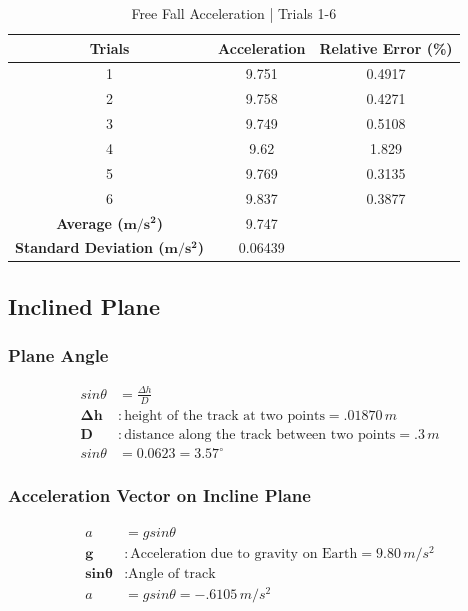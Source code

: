 \documentclass[a4paper,12pt]{article}
\begin{document}
\begin{table}[H]
\centering
\begin{tabular}{@{}ccc@{}}
\toprule
\textbf{Trials} & \textbf{Acceleration} & \textbf{Relative Error (\%)} \\ \midrule
1 & 9.751 & 0.4917 \\
2 & 9.758 & 0.4271 \\
3 & 9.749 & 0.5108 \\
4 & 9.62 & 1.829 \\
5 & 9.769 & 0.3135 \\
6 & 9.837 & 0.3877 \\ \midrule
\textbf{Average ($\boldsymbol{m/s^2}$)} & 9.747 &  \\
\textbf{Standard Deviation ($\boldsymbol{m/s^2}$)} & 0.06439 &  \\ \bottomrule
\end{tabular}
\caption{Free Fall Acceleration | Trials 1-6}
\label{tab:ff-ta}
\end{table}

\subsection{Inclined Plane}


	\subsubsection{Plane Angle}
	\begin{align*}
		sin\theta &= \frac{\Delta h}{D} \\
		\boldsymbol{\Delta h} &: \text{height of the track at two points} = \boxed{.01870\,m} \\
		\textbf{D} &: \text{distance along the track between two points} = \boxed{.3\,m} \\
		sin\theta &= 0.0623 = \boxed{3.57^\circ}
	\end{align*}

	\subsubsection{Acceleration Vector on Incline Plane}
	
	\begin{align*}
		a&=gsin\theta \\
		\textbf{g} &: \text{Acceleration due to gravity on Earth} = \boxed{9.80\,m/s^2} \\
		\boldsymbol{sin\theta} &: \text{Angle of track} \\
		a&=gsin\theta = \boxed{-.6105\,m/s^2}
	\end{align*}
\end{document}
